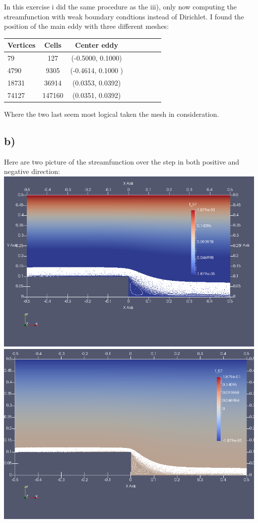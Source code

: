 \documentclass[a4paper,norsk]{article}
\begin{document}
In this exercise i did the same procedure as the iii), only now computing the streamfunction with weak boundary condtions instead of Dirichlet. 
I found the position of the main eddy with three different meshes: \newline
\newline
\begin{tabular}{l*{6}{c}r}
   Vertices & Cells & Center eddy\\
 \hline 
79 &127 & (-0.5000, 0.1000) \\
4790 & 9305& (-0.4614, 0.1000 )\\
18731 & 36914 & (0.0353, 0.0392)\\ 
74127 & 147160 & (0.0351, 0.0392) \\
\hline
\end{tabular}
\newline
\newline
Where the two last seem most logical taken the mesh in consideration.
\newline
\subsection*{b)}
Here are two picture of the streamfunction over the step in both positive and negative direction:
\newline
\newline
\includegraphics[trim = 0mm 0mm 0mm 0mm, clip, scale=0.4]{Stream_down.png}
\newline
\includegraphics[trim = 0mm 0mm 0mm 0mm, clip, scale=0.4]{Stream_up.png}
\end{document}
